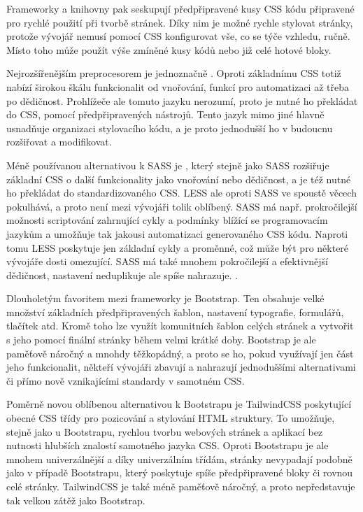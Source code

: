 		Frameworky a knihovny pak seskupují předpřipravené kusy \Ac{CSS} kódu připravené pro rychlé použití při tvorbě stránek.
		Díky nim je možné rychle stylovat stránky, protože vývojář nemusí pomocí \Ac{CSS} konfigurovat vše, co se
		týče vzhledu, ručně.
		Místo toho může použít výše zmíněné kusy kódů nebo již celé hotové bloky.

		Nejrozšířenějším preprocesorem je jednoznačně .
		Oproti základnímu \Ac{CSS} totiž nabízí širokou škálu funkcionalit od vnořování, funkcí pro automatizaci až třeba
		po dědičnost.
		Prohlížeče ale tomuto jazyku nerozumí, proto je nutné ho překládat do \Ac{CSS}, pomocí předpřipravených nástrojů.
		Tento jazyk mimo jiné hlavně usnadňuje organizaci stylovacího kódu, a je proto jednodušší ho v budoucnu rozšiřovat a
		modifikovat. \cite{learn_sass}

		Méně používanou alternativou k \Ac{SASS} je , který stejně jako \Ac{SASS} rozšiřuje základní \Ac{CSS}
		o další funkcionality jako vnořování nebo dědičnost, a je též nutné ho překládat do standardizovaného \Ac{CSS}. \cite{less_overview}
		\Ac{LESS} ale oproti \Ac{SASS} ve spoustě věcech pokulhává, a proto není mezi vývojáři tolik oblíbený.
		\Ac{SASS} má např. prokročilejší možnosti scriptování zahrnující cykly a podmínky blížící se programovacím jazykům
		a umožňuje tak jakousi automatizaci generovaného \Ac{CSS} kódu.
		Naproti tomu \Ac{LESS} poskytuje jen základní cykly a proměnné, což může být pro některé vývojáře dosti omezující.
		\Ac{SASS} má také mnohem pokročilejší a efektivnější dědičnost, nastavení neduplikuje ale spíše nahrazuje. \cite{sass_vs_less}.

		Dlouholetým favoritem mezi frameworky je Bootstrap.
		Ten obsahuje velké množství základních předpřipravených šablon, nastavení typografie, formulářů, tlačítek atd.
		Kromě toho lze využít komunitních šablon celých stránek a vytvořit s jeho pomocí finální stránky během velmi krátké doby.
		Bootstrap je ale paměťově náročný a mnohdy těžkopádný, a proto se ho, pokud využívají jen část jeho funkcionalit,
		někteří vývojáři zbavují a nahrazují jednoduššími alternativami či přímo nově vznikajícími standardy
		v samotném \Ac{CSS}. \cite{bootstrap}

		Poměrně novou oblíbenou alternativou k Bootstrapu je TailwindCSS poskytující obecné \Ac{CSS} třídy pro
		pozicování a stylování \Ac{HTML} struktury.
		To umožňuje, stejně jako u Bootstrapu, rychlou tvorbu webových stránek a aplikací bez nutnosti hlubších znalostí
		samotného jazyka \Ac{CSS}. \cite{tailwindcss}
		Oproti Bootstrapu je ale mnohem univerzálnější a díky univerzálním třídám, stránky nevypadají podobně jako v případě
		Bootstrapu, který poskytuje spíše předpřipravené bloky či rovnou celé stránky.
		TailwindCSS je také méně paměťově náročný, a proto nepředstavuje tak velkou zátěž jako Bootstrap.
		\cite{tailwindcss_vs_bootstrap}

